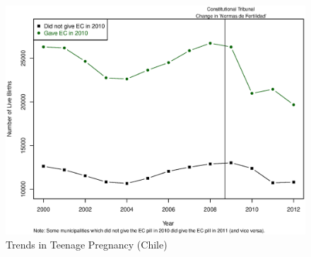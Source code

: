 \documentclass[10pt,letterpaper,subeqn]{beamer}
\begin{document}
\begin{frame}[label=empirA1]
\begin{figure}
\begin{center}
\caption{Trends in Teenage Pregnancy (Chile)}
\includegraphics[scale=0.45]{./figures/Reform1519.eps}
\end{center}
\end{figure}
\end{frame}

\begin{frame}[label=empirA2]

\end{frame}
\end{document}
